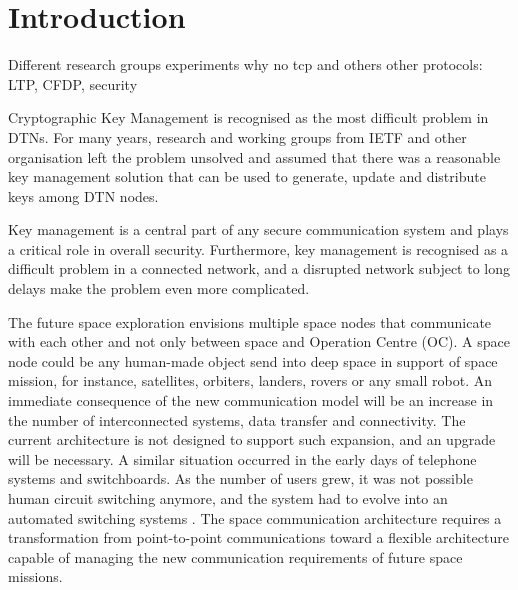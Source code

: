 \section{Introduction}


Different research groups
experiments
why no tcp and others
other protocols: LTP, CFDP, 
security

Cryptographic Key Management is recognised as the most difficult problem in DTNs. For many years, research and working groups from IETF and other organisation left the problem unsolved and assumed that there was a reasonable key management solution that can be used to generate, update and distribute keys among DTN nodes. 

Key management is a central part of any secure communication system and plays a critical role in overall security. Furthermore, key management is recognised as a difficult problem in a connected network, and a disrupted network subject to long delays make the problem even more complicated.  


The future space exploration envisions multiple space nodes that communicate with each other and not only between space and Operation Centre (OC). A space node could be any human-made object send into deep space in support of space mission, for instance, satellites, orbiters, landers, rovers or any small robot. An immediate consequence of the new communication model will be an increase in the number of interconnected systems, data transfer and connectivity. The current architecture is not designed to support such expansion, and an upgrade will be necessary. A similar situation occurred in the early days of telephone systems and switchboards. As the number of users grew, it was not possible human circuit switching anymore, and the system had to evolve into an automated switching systems \cite{rationale2010requirements}. The space communication architecture requires a transformation from point-to-point communications toward a flexible architecture capable of managing the new communication requirements of future space missions. 

